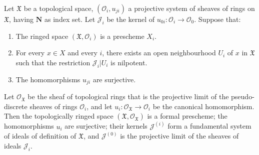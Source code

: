 \begin{proposition}[10.6.3]
\label{I.10.6.3}
Let $\mathfrak{X}$ be a topological space,
$(\mathscr{O}_i,u_{ji})$ a projective system of sheaves of rings on
$\mathfrak{X}$, having $\mathbf{N}$ as index set. Let
$\mathscr{J}_i$ be the kernel of
$u_{0i}:\mathscr{O}_i\to\mathscr{O}_0$. Suppose that:
\begin{enumerate}
  \item[a)] The ringed space $(\mathfrak{X},\mathscr{O}_i)$ is a
    prescheme $X_i$.
  \item[b)] For every $x\in X$ and every $i$, there exists an open
    neighbourhood $U_i$ of $x$ in $\mathfrak{X}$ such that the
    restriction $\mathscr{J}_i|U_i$ is nilpotent.
  \item[c)] The homomorphisms $u_{ji}$ are surjective.
\end{enumerate}


Let $\mathscr{O}_{\mathfrak{X}}$ be the sheaf of topological rings
that is the projective limit of the pseudo-discrete sheaves of rings
$\mathscr{O}_i$, and let
$u_i:\mathscr{O}_{\mathfrak{X}}\to\mathscr{O}_i$ be the canonical
homomorphism. Then the topologically ringed space
$(\mathfrak{X},\mathscr{O}_{\mathfrak{X}})$ is a formal prescheme;
the homomorphisms $u_i$ are surjective; their kernels
$\mathscr{J}^{(i)}$ form a fundamental system of ideals of definition
of $\mathfrak{X}$, and $\mathscr{J}^{(0)}$ is the projective limit of the
sheaves of ideals $\mathscr{J}_i$.
\end{proposition}

